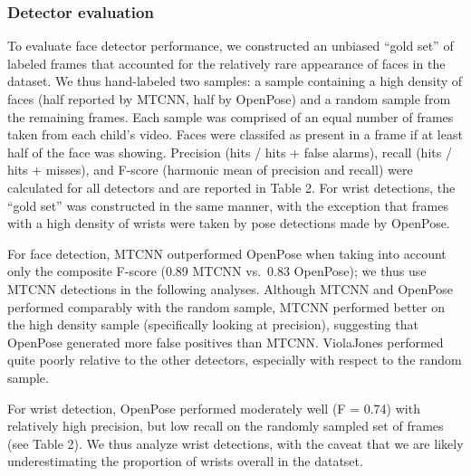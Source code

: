 \documentclass[10pt, letterpaper]{article}
\begin{document}
\subsubsection{Detector evaluation}\label{detector-evaluation}

To evaluate face detector performance, we constructed an unbiased ``gold
set'' of labeled frames that accounted for the relatively rare
appearance of faces in the dataset. We thus hand-labeled two samples: a
sample containing a high density of faces (half reported by MTCNN, half
by OpenPose) and a random sample from the remaining frames. Each sample
was comprised of an equal number of frames taken from each child's
video. Faces were classifed as present in a frame if at least half of
the face was showing. Precision (hits / hits + false alarms), recall
(hits / hits + misses), and F-score (harmonic mean of precision and
recall) were calculated for all detectors and are reported in Table 2.
For wrist detections, the ``gold set'' was constructed in the same
manner, with the exception that frames with a high density of wrists
were taken by pose detections made by OpenPose.

For face detection, MTCNN outperformed OpenPose when taking into account
only the composite F-score (0.89 MTCNN vs.~0.83 OpenPose); we thus use
MTCNN detections in the following analyses. Although MTCNN and OpenPose
performed comparably with the random sample, MTCNN performed better on
the high density sample (specifically looking at precision), suggesting
that OpenPose generated more false positives than MTCNN. ViolaJones
performed quite poorly relative to the other detectors, especially with
respect to the random sample.

For wrist detection, OpenPose performed moderately well (F = 0.74) with
relatively high precision, but low recall on the randomly sampled set of
frames (see Table 2). We thus analyze wrist detections, with the caveat
that we are likely underestimating the proportion of wrists overall in
the datatset.
\end{document}
